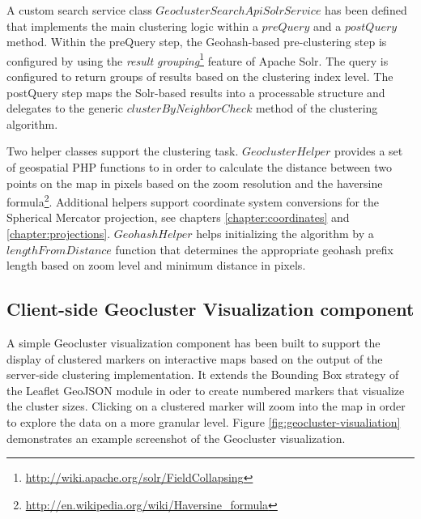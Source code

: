 \begin{itemize}
A custom search service class $GeoclusterSearchApiSolrService$ has been defined that implements the main clustering logic within a $preQuery$ and a $postQuery$ method. Within the preQuery step, the Geohash-based pre-clustering step is configured by using the \textit{result grouping}\footnote{\url{http://wiki.apache.org/solr/FieldCollapsing}} feature of Apache Solr. The query is configured to return groups of results based on the clustering index level. The postQuery step maps the Solr-based results into a processable structure and delegates to the generic $clusterByNeighborCheck$ method of the clustering algorithm.

\end{itemize}

Two helper classes support the clustering task. $GeoclusterHelper$ provides a set of geospatial PHP functions to in order to calculate the distance between two points on the map in pixels based on the zoom resolution and the haversine formula\footnote{\url{http://en.wikipedia.org/wiki/Haversine_formula}}. Additional helpers support coordinate system conversions for the Spherical Mercator projection, see chapters \ref{chapter:coordinates} and \ref{chapter:projections}. $GeohashHelper$ helps initializing the algorithm by a $lengthFromDistance$ function that determines the appropriate geohash prefix length based on zoom level and minimum distance in pixels.


\subsection{Client-side Geocluster Visualization component}

A simple Geocluster visualization component has been built to support the display of clustered markers on interactive maps based on the output of the server-side clustering implementation. It extends the Bounding Box strategy of the Leaflet GeoJSON module in oder to create numbered markers that visualize the cluster sizes. Clicking on a clustered marker will zoom into the map in order to explore the data on a more granular level. Figure \ref{fig:geocluster-visualiation} demonstrates an example screenshot of the Geocluster visualization.

